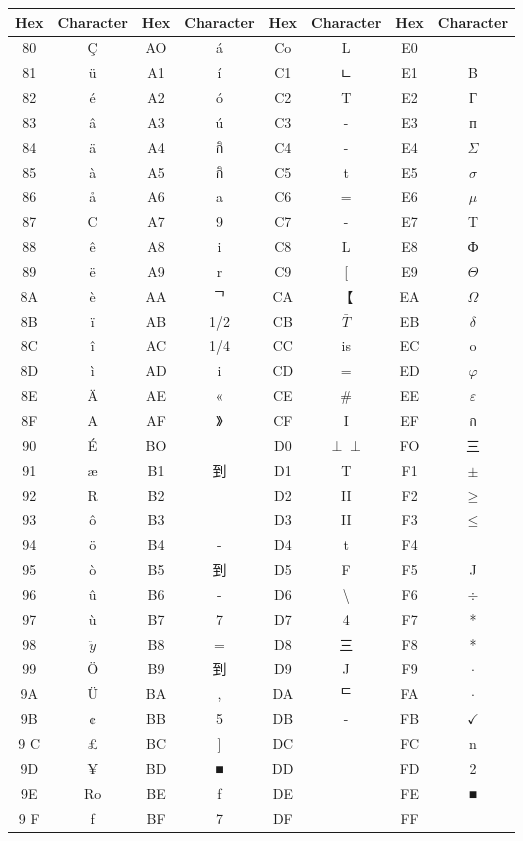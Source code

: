 \documentclass[10pt]{article}
\def\Perp{\perp\!\!\!\perp}
\begin{document}
\begin{center}
\begin{tabular}{|c|c|c|c|c|c|c|c|}
\hline
Hex & Character & Hex & Character & Hex & Character & Hex & Character \\
\hline
80 & Ç & AO & á & Co & L & E0 &  \\
\hline
81 & ü & A1 & í & C1 & ㄴ & E1 & B \\
\hline
82 & é & A2 & ó & C2 & T & E2 & Г \\
\hline
83 & â & A3 & ú & C3 & - & E3 & п \\
\hline
84 & ä & A4 & กิ & C4 & - & E4 & $\Sigma$ \\
\hline
85 & à & A5 & กิ & C5 & t & E5 & $\sigma$ \\
\hline
86 & å & A6 & a & C6 & = & E6 & $\mu$ \\
\hline
87 & C & A7 & 9 & C7 & - & E7 & T \\
\hline
88 & ê & A8 & i & C8 & L & E8 & Ф \\
\hline
89 & ë & A9 & r & C9 & [ & E9 & $\Theta$ \\
\hline
8A & è & AA & ᄀ & CA & 【 & EA & $\Omega$ \\
\hline
8B & ï & AB & 1/2 & CB & $\bar{T}$ & EB & $\delta$ \\
\hline
8C & î & AC & 1/4 & CC & is & EC & o \\
\hline
8D & ì & AD & i & CD & = & ED & $\varphi$ \\
\hline
8E & Ä & AE & « & CE & \# & EE & $\varepsilon$ \\
\hline
8F & A & AF & 》 & CF & I & EF & ก \\
\hline
90 & É & BO &  & D0 & $\Perp$ & FO & 三 \\
\hline
91 & æ & B1 & 到 & D1 & T & F1 & $\pm$ \\
\hline
92 & R & B2 &  & D2 & II & F2 & $\geq$ \\
\hline
93 & ô & B3 &  & D3 & II & F3 & $\leq$ \\
\hline
94 & ö & B4 & - & D4 & t & F4 &  \\
\hline
95 & ò & B5 & 到 & D5 & F & F5 & J \\
\hline
96 & û & B6 & - & D6 & \textbackslash  & F6 & $\div$ \\
\hline
97 & ù & B7 & 7 & D7 & 4 & F7 & * \\
\hline
98 & $\ddot{y}$ & B8 & = & D8 & 三 & F8 & * \\
\hline
99 & Ö & B9 & 到 & D9 & J & F9 & $\cdot$ \\
\hline
9A & Ü & BA & , & DA & ᄃ & FA & $\cdot$ \\
\hline
9B & ¢ & BB & 5 & DB & - & FB & $\checkmark$ \\
\hline
9 C & £ & BC & ] & DC &  & FC & n \\
\hline
9D & ¥ & BD & ■ & DD &  & FD & 2 \\
\hline
9E & Ro & BE & f & DE &  & FE & ■ \\
\hline
9 F & f & BF & 7 & DF &  & FF &  \\
\hline
\end{tabular}
\end{center}
\end{document}
